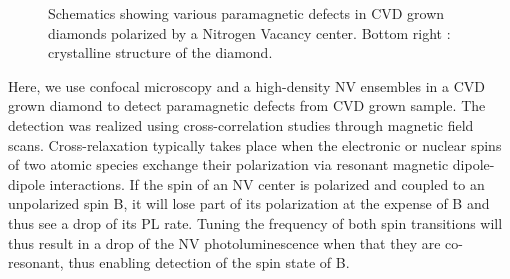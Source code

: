 \documentclass[9pt,twocolumn,twoside]{osajnl}
\begin{document}
 \begin{figure}[htbp]
\centering
{}
\caption{Schematics showing various paramagnetic defects in CVD grown diamonds polarized by a Nitrogen Vacancy center. Bottom right :  crystalline structure of the diamond.}
\label{fig1}
\end{figure}




Here, we use confocal microscopy and a high-density NV ensembles in a CVD grown diamond to detect paramagnetic defects from CVD grown sample.
The detection was realized using cross-correlation studies through magnetic field scans. 
Cross-relaxation typically takes place when the electronic or nuclear spins of two atomic species exchange their polarization via resonant magnetic dipole-dipole interactions. 
If the spin of an NV center is polarized and coupled to an unpolarized spin B, it will lose part of its polarization at the expense of B and thus see a drop of its PL rate. 
Tuning the frequency of both spin transitions will thus result in a drop of the NV photoluminescence when that they are co-resonant, thus enabling detection of the spin state of B.
\end{document}
